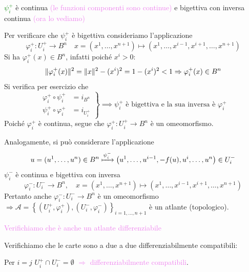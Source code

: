 \begin{esempio}
        \textcolor{green}{$\psi_i^+$} è continua \textcolor{violet}{(le funzioni componenti sono continue)} e bigettiva con inversa continua \textcolor{violet}{(ora lo vediamo)} 
        
        Per verificare che $\psi_i^+$ è bigettiva consideriamo l'applicazione
        \[
        \varphi_i^+ : U_i^+ \to B^n \quad x = (x^1, \dots, x^{n+1}) \mapsto (x^1, \dots, x^{i-1}, x^{i+1}, \dots, x^{n+1})
        \]
        Si ha $\varphi_i^+(x) \in B^n$, infatti poiché $x^i > 0$:
        \[
        \lVert\varphi_i^+(x)\rVert^2 = \lVert x\rVert^2 - (x^i)^2 = 1 - (x^i)^2 < 1 \Rightarrow \varphi_i^+(x) \in B^n
        \]
        Si verifica per esercizio che
        \[
        \left.
        \begin{aligned}
        \varphi_i^+ \circ \psi_i^+ &= i_{B^n} \\
        \psi_i^+ \circ \varphi_i^+ &= i_{U_i^+}
        \end{aligned}
        \right\} \implies \psi_i^+ \text{ è bigettiva e la sua inversa è } \varphi_i^+
        \]
        Poiché $\varphi_i^+$ è continua, segue che $\varphi_i^+ : U_i^+ \to B^n$ è un omeomorfismo.

        Analogamente, si può considerare l'applicazione
        \[
        u = (u^1, \dots, u^n) \in B^n \xmapsto{\psi_i^-} \left( u^1, \dots, u^{i-1}, -f(u), u^i, \dots, u^n \right) \in U_i^-
        \]
        $\psi_i^-$ è continua e bigettiva con inversa
        \[
       \varphi_i^- : U_i^- \to B^n, \quad x = (x^1, \dots, x^{n+1}) \mapsto (x^1, \dots, x^{i-1}, x^{i+1}, \dots, x^{n+1})
        \]
        Pertanto anche $\varphi_i^- : U_i^- \to B^n$ è un omeomorfismo
        $\Rightarrow \mathcal{A} =
        \left\{ (U_i^+, \varphi_i^+), (U_i^-, \varphi_i^-) \right\}_{i=1, \dots, n+1}$
        è un atlante (topologico).

        \textcolor{violet}{Verifichiamo che è anche un atlante differenziabile}   

        Verifichiamo che le carte sono a due a due differenziabilmente compatibili:

        Per $i=j$ $U_i^+ \cap U_i^- = \emptyset$ \textcolor{violet}{$\Rightarrow$ differenziabilmente compatibili}.
        

\end{esempio}
